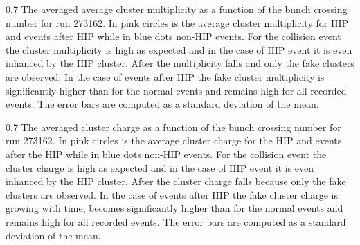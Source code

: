                  {0.7}       %
                 {The averaged average cluster multiplicity as a function of the bunch crossing number for run 273162. In pink circles is the average cluster multiplicity for HIP and events after HIP while in blue dots non-HIP events. For the collision event the cluster multiplicity is high as expected and in the case of HIP event it is even inhanced by the HIP cluster. After the multiplicity falls and only the fake clusters are observed. In the case of events after HIP the fake cluster multiplicity is significantly higher than for the normal events and remains high for all recorded events. The error bars are computed as a standard deviation of the mean. } %

                 {0.7}       %
                 {The averaged cluster charge as a function of the bunch crossing number for run 273162. In pink circles is the average cluster charge for the HIP and events after the HIP while in blue dots non-HIP events. For the collision event the cluster charge is high as expected and in the case of HIP event it is even inhanced by the HIP cluster. After the cluster charge falls because only the fake clusters are observed. In the case of events after HIP the fake cluster charge is growing with time, becomes significantly higher than for the normal events and remains high for all recorded events. The error bars are computed as a standard deviation of the mean. } %

